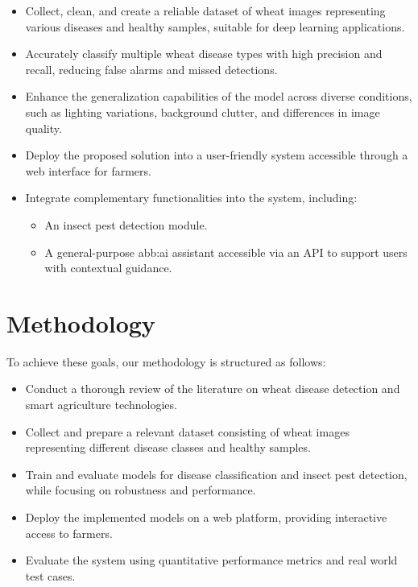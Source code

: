 \begin{itemize}
    \item Collect, clean, and create a reliable dataset of wheat images representing various diseases and healthy samples, suitable for deep learning applications.
    \item Accurately classify multiple wheat disease types with high precision and recall, reducing false alarms and missed detections.
    \item Enhance the generalization capabilities of the model across diverse conditions, such as lighting variations, background clutter, and differences in image quality.
    \item Deploy the proposed solution into a user-friendly system accessible through a web interface for farmers.
    \item Integrate complementary functionalities into the system, including:
    \begin{itemize}
        \item An insect pest detection module.
        \item A general-purpose \gls{abb:ai} assistant accessible via an API to support users with contextual guidance.
    \end{itemize}
\end{itemize}

\section*{Methodology}

To achieve these goals, our methodology is structured as follows:

\begin{itemize}
    \item Conduct a thorough review of the literature on wheat disease detection and smart agriculture technologies.
    \item Collect and prepare a relevant dataset consisting of wheat images representing different disease classes and healthy samples.
    \item Train and evaluate models for disease classification and insect pest detection, while focusing on robustness and performance.
    \item Deploy the implemented models on a web platform, providing interactive access to farmers.
    \item Evaluate the system using quantitative performance metrics and real world test cases.
\end{itemize}

